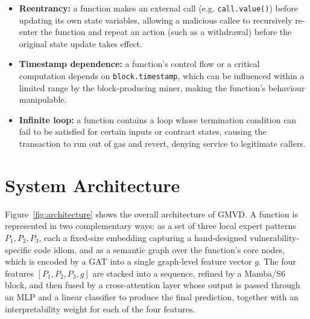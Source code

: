 \documentclass[12pt, a4paper, openright, twoside]{report}
\begin{document}
\begin{itemize}
    \item \textbf{Reentrancy:} a function makes an external call (e.g. \texttt{call.value()}) before updating its own state variables, allowing a malicious callee to recursively re-enter the function and repeat an action (such as a withdrawal) before the original state update takes effect.
    \item \textbf{Timestamp dependence:} a function's control flow or a critical computation depends on \texttt{block.timestamp}, which can be influenced within a limited range by the block-producing miner, making the function's behaviour manipulable.
    \item \textbf{Infinite loop:} a function contains a loop whose termination condition can fail to be satisfied for certain inputs or contract states, causing the transaction to run out of gas and revert, denying service to legitimate callers.
\end{itemize}

\section{System Architecture}

Figure~\ref{fig:architecture} shows the overall architecture of GMVD. A function is represented in two complementary ways: as a set of three local expert patterns $P_1, P_2, P_3$, each a fixed-size embedding capturing a hand-designed vulnerability-specific code idiom, and as a semantic graph over the function's core nodes, which is encoded by a GAT into a single graph-level feature vector $g$. The four features $[P_1, P_2, P_3, g]$ are stacked into a sequence, refined by a Mamba/S6 block, and then fused by a cross-attention layer whose output is passed through an MLP and a linear classifier to produce the final prediction, together with an interpretability weight for each of the four features.
\end{document}
